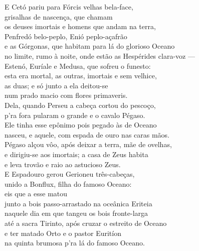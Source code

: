 \begin{pages}
\begin{Rightside}
\Para
E Cetó pariu para Fórcis velhas bela-face,\\
grisalhas de nascença, que chamam \\
os deuses imortais e homens que andam na terra,\\
Penfredó belo-peplo, Enió peplo-açafrão\\
e as Górgonas, que habitam para lá do glorioso Oceano\\
no limite, rumo à noite, onde estão as Hespérides clara-voz --- \\
Estenó, Euríale e Medusa, que sofreu o funesto:\\
esta era mortal, as outras, imortais e sem velhice,\\
as duas; e só junto a ela deitou-se \\
num prado macio com flores primaveris.\\
Dela, quando Perseu a cabeça cortou do pescoço, \\
p'ra fora pularam o grande  e o cavalo Pégaso.\\
Ele tinha esse epônimo pois pegado às  de Oceano\\
nasceu, e aquele, com espada de ouro nas caras mãos.\\
Pégaso alçou vôo, após deixar a terra, mãe de ovelhas,\\
e dirigiu-se aos imortais; a casa de Zeus habita \\
e leva trovão e raio ao astucioso Zeus.\\
E Espadouro gerou Gerioneu três-cabeças,\\
unido a Bonflux, filha do famoso Oceano:\\
eis que a esse matou \\
junto a bois passo-arrastado na oceânica Eriteia \\
naquele dia em que tangeu os bois fronte-larga\\
até a sacra Tirinto, após cruzar o estreito de Oceano\\
e ter matado Orto e o pastor Euritíon\\
na quinta brumosa p'ra lá do famoso Oceano.\\


\end{Rightside}
\end{pages}
